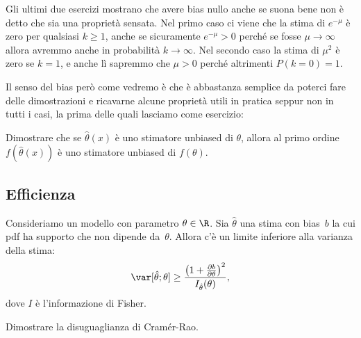 Gli ultimi due esercizi mostrano che avere bias nullo anche se suona bene non è
detto che sia una proprietà sensata. Nel primo caso ci viene che la stima di
$e^{-\mu}$ è zero per qualsiasi $k \ge 1$, anche se sicuramente $e^{-\mu} > 0$
perché se fosse $\mu \to \infty$ allora avremmo anche in probabilità $k \to
\infty$. Nel secondo caso la stima di $\mu^2$ è zero se $k=1$, e anche lì
sapremmo che $\mu > 0$ perché altrimenti $P(k=0) = 1$.

Il senso del bias però come vedremo è che è abbastanza semplice da poterci fare
delle dimostrazioni e ricavarne alcune proprietà utili in pratica seppur non
in tutti i casi, la prima delle quali lasciamo come esercizio:

\begin{exercise}
    Dimostrare che se $\hat\theta(x)$ è uno stimatore unbiased di $\theta$,
    allora al primo ordine $f(\hat\theta(x))$ è uno stimatore unbiased di
    $f(\theta)$.
\end{exercise}


\subsection{Efficienza}

\begin{theorem}
	\label{th:cramerrao}
	Consideriamo un modello con parametro $\theta\in\R$.
	Sia $\hat\theta$ una stima con bias~$b$
	la cui pdf ha supporto che non dipende da~$\theta$.
	Allora c'è un limite inferiore alla varianza della stima:
	\begin{equation*}
		\var[\hat\theta;\theta] \ge \frac{\left( 1 + \frac{\partial b}{\partial\theta} \right)^2}{I_{\hat\theta}(\theta)},
	\end{equation*}
	dove $I$ è l'informazione di Fisher.
\end{theorem}

\begin{exercise}
    Dimostrare la disuguaglianza di Cramér-Rao.
\end{exercise}

